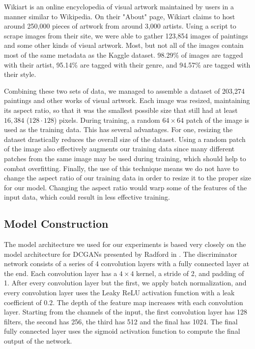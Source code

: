\documentclass[10pt,twocolumn,letterpaper]{article}
\begin{document}
Wikiart is an online encyclopedia of visual artwork maintained by users in a manner similar to Wikipedia. On their "About" page, Wikiart claims to host around 250,000 pieces of artwork from around 3,000 artists. Using a script to scrape images from their site, we were able to gather 123,854 images of paintings and some other kinds of visual artwork. Most, but not all of the images contain most of the same metadata as the Kaggle dataset. 98.29\% of images are tagged with their artist, 95.14\% are tagged with their genre, and 94.57\% are tagged with their style.

Combining these two sets of data, we managed to assemble a dataset of 203,274 paintings and other works of visual artwork. Each image was resized, maintaining its aspect ratio, so that it was the smallest possible size that still had at least $ 16,384 $ ($ 128 \cdot 128 $) pixels. During training, a random $ 64 \times 64 $ patch of the image is used as the training data. This has several advantages. For one, resizing the dataset drastically reduces the overall size of the dataset. Using a random patch of the image also effectively augments our training data since many different patches from the same image may be used during training, which should help to combat overfitting. Finally, the use of this technique means we do not have to change the aspect ratio of our training data in order to resize it to the proper size for our model. Changing the aspect ratio would warp some of the features of the input data, which could result in less effective training.

\subsection{Model Construction}
The model architecture we used for our experiments is based very closely on the model architecture for DCGANs presented by Radford \etal in \cite{radford2015unsupervised}. The discriminator network consists of a series of 4 convolution layers with a fully connected layer at the end. Each convolution layer has a $ 4 \times 4 $ kernel, a stride of 2, and padding of 1. After every convolution layer but the first, we apply batch normalization, and every convolution layer uses the Leaky ReLU activation function \cite{maas2013rectifier} with a leak coefficient of $ 0.2 $. The depth of the feature map increases with each convolution layer. Starting from the channels of the input, the first convolution layer has 128 filters, the second has 256, the third has 512 and the final has 1024. The final fully connected layer uses the sigmoid activation function to compute the final output of the network.
\end{document}
